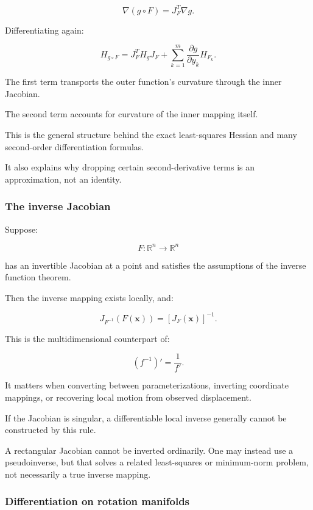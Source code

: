 \[
\nabla(g\circ F)=J_F^T\nabla g.
\]

Differentiating again:

\[
\boxed{ H_{g\circ F} = J_F^TH_gJ_F + \sum_{k=1}^{m} \frac{\partial g}{\partial y_k}H_{F_k} }.
\]

The first term transports the outer function's curvature through the inner Jacobian.

The second term accounts for curvature of the inner mapping itself.

This is the general structure behind the exact least-squares Hessian and many second-order differentiation formulas.

It also explains why dropping certain second-derivative terms is an approximation, not an identity.

\subsubsection{The inverse Jacobian}\label{02-foundations-ii-ch021-the-inverse-jacobian}

Suppose:

\[
F:\mathbb R^n\to\mathbb R^n
\]

has an invertible Jacobian at a point and satisfies the assumptions of the inverse function theorem.

Then the inverse mapping exists locally, and:

\[
\boxed{ J_{F^{-1}}(F(\mathbf x))= [J_F(\mathbf x)]^{-1} }.
\]

This is the multidimensional counterpart of:

\[
(f^{-1})'=\frac1{f'}.
\]

It matters when converting between parameterizations, inverting coordinate mappings, or recovering local motion from observed displacement.

If the Jacobian is singular, a differentiable local inverse generally cannot be constructed by this rule.

A rectangular Jacobian cannot be inverted ordinarily. One may instead use a pseudoinverse, but that solves a related least-squares or minimum-norm problem, not necessarily a true inverse mapping.

\subsubsection{Differentiation on rotation manifolds}\label{02-foundations-ii-ch021-differentiation-on-rotation-manifolds}

